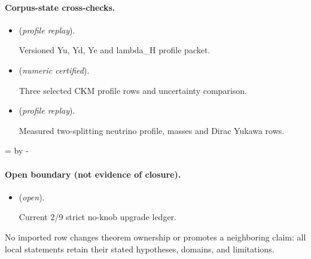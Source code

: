 \documentclass[11pt]{article}
\begin{document}
\paragraph{Corpus-state cross-checks.}
\begin{itemize}
\setlength{\itemsep}{0.25em}
\item {} (\emph{profile replay}).\par Versioned Yu, Yd, Ye and lambda\_H profile packet.
\item {} (\emph{numeric certified}).\par Three selected CKM profile rows and uncertainty comparison.
\item {} (\emph{profile replay}).\par Measured two-splitting neutrino profile, masses and Dirac Yukawa rows.
\end{itemize}

\par\begingroup{}=\pagegoal\advance{} by -\pagetotal\ifdim\dimen0<7\baselineskip\newpage\fi\endgroup
\paragraph{Open boundary (not evidence of closure).}
\begin{itemize}
\setlength{\itemsep}{0.25em}
\item {} (\emph{open}).\par Current 2/9 strict no-knob upgrade ledger.
\end{itemize}

No imported row changes theorem ownership or promotes a neighboring claim: all local statements retain their stated hypotheses, domains, and limitations.
\end{document}
